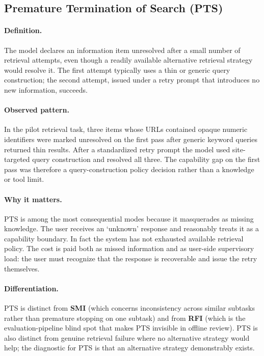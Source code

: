 \documentclass[11pt]{article}
\begin{document}
\subsection{Premature Termination of Search (PTS)}
\paragraph{Definition.} The model declares an information item unresolved after a small number of retrieval attempts, even though a readily available alternative retrieval strategy would resolve it. The first attempt typically uses a thin or generic query construction; the second attempt, issued under a retry prompt that introduces no new information, succeeds.

\paragraph{Observed pattern.} In the pilot retrieval task, three items whose URLs contained opaque numeric identifiers were marked unresolved on the first pass after generic keyword queries returned thin results. After a standardized retry prompt the model used site-targeted query construction and resolved all three. The capability gap on the first pass was therefore a query-construction policy decision rather than a knowledge or tool limit.

\paragraph{Why it matters.} PTS is among the most consequential modes because it masquerades as missing knowledge. The user receives an `unknown' response and reasonably treats it as a capability boundary. In fact the system has not exhausted available retrieval policy. The cost is paid both as missed information and as user-side supervisory load: the user must recognize that the response is recoverable and issue the retry themselves.

\paragraph{Differentiation.} PTS is distinct from \textbf{SMI} (which concerns inconsistency across similar subtasks rather than premature stopping on one subtask) and from \textbf{RFI} (which is the evaluation-pipeline blind spot that makes PTS invisible in offline review). PTS is also distinct from genuine retrieval failure where no alternative strategy would help; the diagnostic for PTS is that an alternative strategy demonstrably exists.
\end{document}
